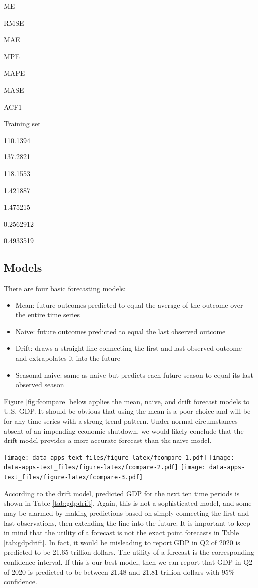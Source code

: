 \documentclass[
]{book}
\providecommand{\tightlist}{%
  \setlength{\itemsep}{0pt}\setlength{\parskip}{0pt}}
\begin{document}
ME

RMSE

MAE

MPE

MAPE

MASE

ACF1

Training set

110.1394

137.2821

118.1553

1.421887

1.475215

0.2562912

0.4933519

\hypertarget{models}{%
\subsection{Models}\label{models}}

There are four basic forecasting models:

\begin{itemize}
\tightlist
\item
  Mean: future outcomes predicted to equal the average of the outcome over the entire time series
\item
  Naive: future outcomes predicted to equal the last observed outcome
\item
  Drift: draws a straight line connecting the first and last observed outcome and extrapolates it into the future
\item
  Seasonal naive: same as naive but predicts each future season to equal its last observed season
\end{itemize}

Figure \ref{fig:fcompare} below applies the mean, naive, and drift forecast models to U.S. GDP. It should be obvious that using the mean is a poor choice and will be for any time series with a strong trend pattern. Under normal circumstances absent of an impending economic shutdown, we would likely conclude that the drift model provides a more accurate forecast than the naive model.

\texttt{[image: data-apps-text\_files/figure-latex/fcompare-1.pdf]} \texttt{[image: data-apps-text\_files/figure-latex/fcompare-2.pdf]} \texttt{[image: data-apps-text\_files/figure-latex/fcompare-3.pdf]}

According to the drift model, predicted GDP for the next ten time periods is shown in Table \ref{tab:gdpdrift}. Again, this is not a sophisticated model, and some may be alarmed by making predictions based on simply connecting the first and last observations, then extending the line into the future. It is important to keep in mind that the utility of a forecast is not the exact point forecasts in Table \ref{tab:gdpdrift}. In fact, it would be misleading to report GDP in Q2 of 2020 is predicted to be 21.65 trillion dollars. The utility of a forecast is the corresponding confidence interval. If this is our best model, then we can report that GDP in Q2 of 2020 is predicted to be between 21.48 and 21.81 trillion dollars with 95\% confidence.
\end{document}
